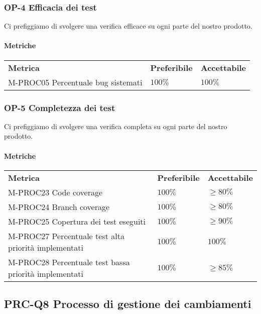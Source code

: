 		\subsubsection{OP-4 Efficacia dei test}
			Ci prefiggiamo di svolgere una verifica efficace su ogni parte del nostro prodotto\glo.
			\paragraph{Metriche} \mbox{}
			\begin{longtable} {
					>{}p{80mm} 
					>{}p{25mm}
					>{}p{25mm}
				}
				\rowcolor{gray!50}
				\textbf{Metrica} & \textbf{Preferibile} & \textbf{Accettabile} \TBstrut \TBstrut \\
				M-PROC05 Percentuale bug sistemati & $100\%$ & $100\%$ \TBstrut \\ [2mm]
			\end{longtable}
			\subsubsection{OP-5 Completezza dei test}
			Ci prefiggiamo di svolgere una verifica completa su ogni parte del nostro prodotto\glo.
			\paragraph{Metriche} \mbox{}
			\begin{longtable} {
					>{}p{80mm} 
					>{}p{25mm}
					>{}p{25mm}
				}
				\rowcolor{gray!50}
				\textbf{Metrica} & \textbf{Preferibile} & \textbf{Accettabile} \TBstrut \TBstrut \\
				M-PROC23 Code coverage & $100\%$ & $\ge 80\%$ \TBstrut \\ [2mm]
				M-PROC24 Branch coverage & $100\%$ & $\ge 80\%$ \TBstrut \\ [2mm]
				M-PROC25 Copertura dei test eseguiti & $100\%$ & $\ge 90\%$ \TBstrut \\ [2mm]
				M-PROC27 Percentuale test alta priorità implementati & $100\%$ & $100\%$ \TBstrut \\ [2mm]
				M-PROC28 Percentuale test bassa priorità implementati & $100\%$ & $\ge 85\%$ \TBstrut \\ [2mm]
			\end{longtable}	
			
	\subsection{PRC-Q8 Processo di gestione dei cambiamenti}
